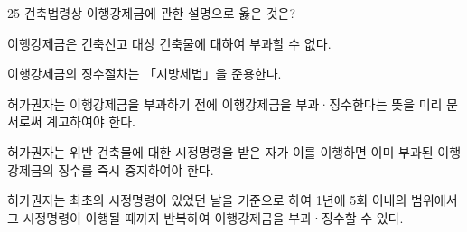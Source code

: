 \begin{question}{25}
건축법령상 이행강제금에 관한 설명으로 옳은 것은?
\begin{choices}
  \item 이행강제금은 건축신고 대상 건축물에 대하여 부과할 수 없다.
  \item 이행강제금의 징수절차는 「지방세법」을 준용한다.
  \item 허가권자는 이행강제금을 부과하기 전에 이행강제금을 부과·징수한다는 뜻을 미리 문서로써 계고하여야 한다.
  \item 허가권자는 위반 건축물에 대한 시정명령을 받은 자가 이를 이행하면 이미 부과된 이행강제금의 징수를 즉시 중지하여야 한다.
  \item 허가권자는 최초의 시정명령이 있었던 날을 기준으로 하여 1년에 5회 이내의 범위에서 그 시정명령이 이행될 때까지 반복하여 이행강제금을 부과·징수할 수 있다.
\end{choices}
\end{question}
